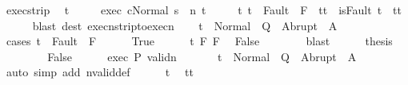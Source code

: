 \begin{isabellebody}
\ exec{\isacharunderscore}strip\ \isamarkupfalse%
\ t{\isacharprime}\ \isanewline
\ \ \ \ exec{\isacharcolon}\ {\isachardoublequoteopen}{\isasymGamma}{\isasymturnstile}{\isasymlangle}c{\isacharcomma}Normal\ s\ {\isasymrangle}\ {\isacharequal}n{\isasymRightarrow}\ t{\isacharprime}{\isachardoublequoteclose}\ \isanewline
\ \ \ \ t{\isacharprime}{\isacharcolon}\ {\isachardoublequoteopen}t{\isacharprime}\ {\isasymin}\ Fault\ {\isacharbackquote}\ {\isacharparenleft}{\isacharminus}F{\isacharprime}{\isacharparenright}\ {\isasymlongrightarrow}\ t{\isacharprime}{\isacharequal}t{\isachardoublequoteclose}\ {\isachardoublequoteopen}{\isasymnot}\ isFault\ t{\isacharprime}\ {\isasymlongrightarrow}\ t{\isacharprime}{\isacharequal}t{\isachardoublequoteclose}\isanewline
\ \ \ \ \isamarkupfalse%
\ {\isacharparenleft}blast\ dest{\isacharcolon}\ execn{\isacharunderscore}strip{\isacharunderscore}to{\isacharunderscore}execn{\isacharparenright}\isanewline
\ \ \isamarkupfalse%
\ {\isachardoublequoteopen}t\ {\isasymin}\ Normal\ {\isacharbackquote}\ Q\ {\isasymunion}\ Abrupt\ {\isacharbackquote}\ A{\isachardoublequoteclose}\isanewline
\ \ \isamarkupfalse%
\ {\isacharparenleft}cases\ {\isachardoublequoteopen}t{\isacharprime}\ {\isasymin}\ Fault\ {\isacharbackquote}\ F{\isachardoublequoteclose}{\isacharparenright}\isanewline
\ \ \ \ \isamarkupfalse%
\ True\isanewline
\ \ \ \ \isamarkupfalse%
\ t{\isacharprime}\ F\ F{\isacharprime}\ \isamarkupfalse%
\ False\isanewline
\ \ \ \ \ \ \isamarkupfalse%
\ blast\isanewline
\ \ \ \ \isamarkupfalse%
\ {\isacharquery}thesis\ \isacommand{{\isachardot}{\isachardot}}\isamarkupfalse%
\isanewline
\ \ \isamarkupfalse%
\isanewline
\ \ \ \ \isamarkupfalse%
\ False\isanewline
\ \ \ \ \isamarkupfalse%
\ exec\ P\ validn\isanewline
\ \ \ \ \isamarkupfalse%
\ {\isacharasterisk}{\isacharcolon}\ {\isachardoublequoteopen}t{\isacharprime}\ {\isasymin}\ Normal\ {\isacharbackquote}\ Q\ {\isasymunion}\ Abrupt\ {\isacharbackquote}\ A{\isachardoublequoteclose}\isanewline
\ \ \ \ \ \ \isamarkupfalse%
\ {\isacharparenleft}auto\ simp\ add{\isacharcolon}\ nvalid{\isacharunderscore}def{\isacharparenright}\isanewline
\ \ \ \ \isamarkupfalse%
\ t{\isacharprime}\ \isamarkupfalse%
\ {\isachardoublequoteopen}t{\isacharprime}{\isacharequal}t{\isachardoublequoteclose}\isanewline
\ \ \ \ \ \ \isamarkupfalse%

\end{isabellebody}
